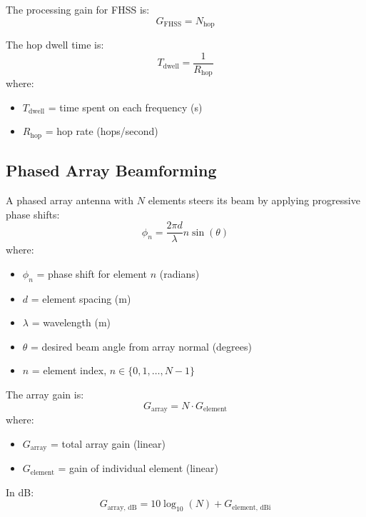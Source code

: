 The processing gain for FHSS is:
\begin{equation}
G_{\text{FHSS}} = N_{\text{hop}}
\label{eq:fhss-gain}
\end{equation}

The hop dwell time is:
\begin{equation}
T_{\text{dwell}} = \frac{1}{R_{\text{hop}}}
\label{eq:hop-dwell}
\end{equation}
where:
\begin{itemize}
\item $T_{\text{dwell}}$ = time spent on each frequency (s)
\item $R_{\text{hop}}$ = hop rate (hops/second)
\end{itemize}

\subsection{Phased Array Beamforming}

A phased array antenna with $N$ elements steers its beam by applying progressive phase shifts:
\begin{equation}
\phi_n = \frac{2\pi d}{\lambda} n \sin(\theta)
\label{eq:phase-shift}
\end{equation}
where:
\begin{itemize}
\item $\phi_n$ = phase shift for element $n$ (radians)
\item $d$ = element spacing (m)
\item $\lambda$ = wavelength (m)
\item $\theta$ = desired beam angle from array normal (degrees)
\item $n$ = element index, $n \in \{0, 1, \ldots, N-1\}$
\end{itemize}

The array gain is:
\begin{equation}
G_{\text{array}} = N \cdot G_{\text{element}}
\label{eq:array-gain}
\end{equation}
where:
\begin{itemize}
\item $G_{\text{array}}$ = total array gain (linear)
\item $G_{\text{element}}$ = gain of individual element (linear)
\end{itemize}

In dB:
\begin{equation}
G_{\text{array, dB}} = 10\log_{10}(N) + G_{\text{element, dBi}}
\label{eq:array-gain-db}
\end{equation}


